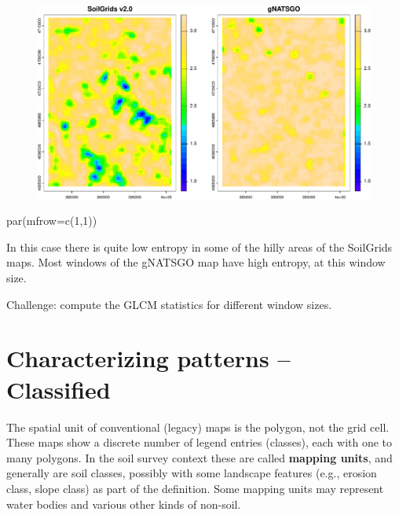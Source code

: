\documentclass[
  letterpaper,
  DIV=11,
  numbers=noendperiod]{scrartcl}
\newenvironment{Shaded}{\begin{snugshade}}{\end{snugshade}}
\newcommand{\AttributeTok}[1]{\textcolor[rgb]{0.40,0.45,0.13}{#1}}
\newcommand{\DecValTok}[1]{\textcolor[rgb]{0.68,0.00,0.00}{#1}}
\newcommand{\FunctionTok}[1]{\textcolor[rgb]{0.28,0.35,0.67}{#1}}
\newcommand{\NormalTok}[1]{\textcolor[rgb]{0.00,0.23,0.31}{#1}}
\begin{document}
\begin{figure}[H]

{\centering \includegraphics{PatternAnalysisWorkshopTutorial_files/figure-pdf/unnamed-chunk-25-1.pdf}

}

\end{figure}

\begin{Shaded}
\begin{Highlighting}[]
\FunctionTok{par}\NormalTok{(}\AttributeTok{mfrow=}\FunctionTok{c}\NormalTok{(}\DecValTok{1}\NormalTok{,}\DecValTok{1}\NormalTok{))}
\end{Highlighting}
\end{Shaded}

In this case there is quite low entropy in some of the hilly areas of
the SoilGrids maps. Most windows of the gNATSGO map have high entropy,
at this window size.

Challenge: compute the GLCM statistics for different window sizes.

\hypertarget{sec-classified}{%
\section{Characterizing patterns -- Classified}\label{sec-classified}}

The spatial unit of conventional (legacy) maps is the polygon, not the
grid cell. These maps show a discrete number of legend entries
(classes), each with one to many polygons. In the soil survey context
these are called \textbf{mapping units}, and generally are soil classes,
possibly with some landscape features (e.g., erosion class, slope class)
as part of the definition. Some mapping units may represent water bodies
and various other kinds of non-soil.
\end{document}
